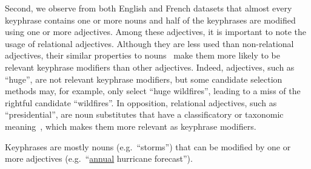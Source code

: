     Second, we observe from both English and French datasets that almost every
    keyphrase contains one or more nouns and half of the keyphrases are modified
    using one or more adjectives.
    Among these adjectives, it is important to note the usage of relational
    adjectives. Although they are less used than non-relational adjectives,
    their similar properties to
    nouns~\cite{bally1944linguistiquegeneraleetlinguistiquefrancaise} make them
    more likely to be relevant keyphrase modifiers than other adjectives.
    Indeed, adjectives, such as ``huge'', are not relevant keyphrase
    modifiers, but some candidate selection methods may, for example, only
    select ``huge wildfires'', leading to a miss of the rightful candidate
    ``wildfires''. In opposition, relational adjectives, such as
    ``presidential'', are noun substitutes that have a classificatory or
    taxonomic meaning~\cite{mcnally2004relationaladjectives}, which makes them
    more relevant as keyphrase modifiers.

    \begin{property}\label{prop:noun_phrases}
      Keyphrases are mostly nouns (e.g.~``storms'') that can be modified by one
      or more adjectives (e.g.~``\underline{annual} hurricane forecast'').
    \end{property}

